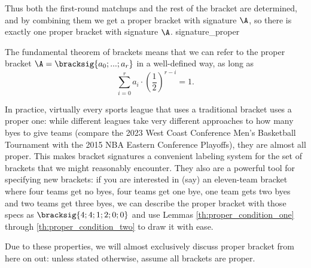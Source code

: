 {{    Thus both the first-round matchups and the rest of the bracket are determined, and by combining them we get a proper bracket with signature $\A$, so there is exactly one proper bracket with signature $\A$.
}{signature_proper}

The fundamental theorem of brackets means that we can refer to the proper bracket $\A = \bracksig{a_0; ...; a_r}$ in a well-defined way, as long as $$\sum_{i=0}^r a_i \cdot \left(\frac{1}{2}\right)^{r - i} = 1.$$

In practice, virtually every sports league that uses a traditional bracket uses a proper one: while different leagues take very different approaches to how many byes to give teams (compare the 2023 West Coast Conference Men's Basketball Tournament with the 2015 NBA Eastern Conference Playoffs), they are almost all proper. This makes bracket signatures a convenient labeling system for the set of brackets that we might reasonably encounter. They also are a powerful tool for specifying new brackets: if you are interested in (say) an eleven-team bracket where four teams get no byes, four teams get one bye, one team gets two byes and two teams get three byes, we can describe the proper bracket with those specs as $\bracksig{4; 4; 1; 2; 0; 0}$ and use Lemmas \ref{th:proper_condition_one} through \ref{th:proper_condition_two} to draw it with ease.


Due to these properties, we will almost exclusively discuss proper bracket from here on out: unless stated otherwise, assume all brackets are proper.
}